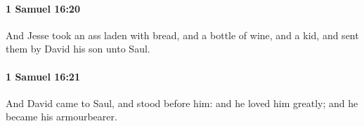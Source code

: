 		\paragraph{1 Samuel 16:20} %
			\label{1SAMUEL-16-20}

			And Jesse took an ass laden with bread, and a bottle of wine, and a kid, and sent them by David his son unto Saul.


		\paragraph{1 Samuel 16:21} %
			\label{1SAMUEL-16-21}

			And David came to Saul, and stood before him: and he loved him greatly; and he became his armourbearer.


